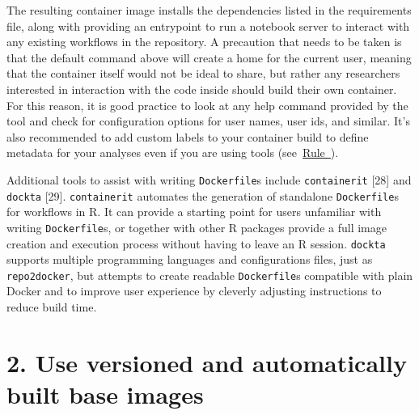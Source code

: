 \documentclass[10pt,letterpaper]{article}
\begin{document}
The resulting container image installs the dependencies listed in the
requirements file, along with providing an entrypoint to run a notebook
server to interact with any existing workflows in the repository. A
precaution that needs to be taken is that the default command above will
create a home for the current user, meaning that the container itself
would not be ideal to share, but rather any researchers interested in
interaction with the code inside should build their own container. For
this reason, it is good practice to look at any help command provided by
the tool and check for configuration options for user names, user ids,
and similar. It's also recommended to add custom labels to your
container build to define metadata for your analyses even if you are
using tools
(see~\hyperref[{rule:metadata}]{Rule~}).

Additional tools to assist with writing \texttt{Dockerfile}s include
\texttt{containerit} {[}28{]} and \texttt{dockta} {[}29{]}.
\texttt{containerit} automates the generation of standalone
\texttt{Dockerfile}s for workflows in R. It can provide a starting point
for users unfamiliar with writing \texttt{Dockerfile}s, or together with
other R packages provide a full image creation and execution process
without having to leave an R session. \texttt{dockta} supports multiple
programming languages and configurations files, just as
\texttt{repo2docker}, but attempts to create readable
\texttt{Dockerfile}s compatible with plain Docker and to improve user
experience by cleverly adjusting instructions to reduce build time.

\hypertarget{use-versioned-and-automatically-built-base-images}{%
\section*{2. Use versioned and automatically built base
images}\label{use-versioned-and-automatically-built-base-images}}

  \label{rule:base} 
\end{document}
